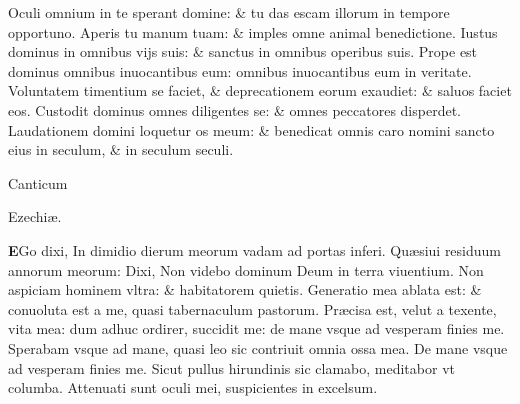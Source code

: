 \documentclass[a5paper,10pt]{book}
\def\leftmarginnote{%
	\lrmarginnote{\hskip -\marginparsep \hskip -6.5em}}
\def\ae{æ}
\begin{document}
\begin{multicols*}{2}
\newline \color{red} O\color{black}culi omnium in te sperant domine: \& tu das escam illorum in tempore opportuno.
\newline \color{red} A\color{black}peris tu manum tuam: \& imples omne animal benedictione.
\newline \color{red} I\color{black}ustus dominus in omnibus vijs suis: \& sanctus in omnibus operibus suis.
\newline \color{red} P\color{black}rope est dominus omnibus inuocantibus eum: omnibus inuocantibus eum in veritate.
\newline \color{red} V\color{black}oluntatem timentium se faciet, \& deprecationem eorum exaudiet: \& saluos faciet eos.
\newline \color{red} C\color{black}ustodit dominus omnes diligentes se: \& omnes peccatores disperdet.
\newline \color{red} L\color{black}audationem domini loquetur os meum: \& benedicat omnis caro nomini sancto eius in seculum, \& in seculum seculi.
\vspace{-1em}
\begin{center} \color{red}
\hypertarget{Ezekiel}{Canticum} Ezechi\ae .
\end{center}
\vspace{-1em}
\lettrine[lines=2]{\bfseries \color{red} E}{}Go dixi,\leftmarginnote{\begin{flushright}Isa.\\38.\end{flushright}} In dimidio dierum meorum vadam ad portas inferi.
\newline \color{red} Q\color{black}u\ae siui residuum annorum meorum: Dixi, Non videbo dominum Deum in terra viuentium.
\newline \color{red} N\color{black}on aspiciam hominem vltra: \& habitatorem quietis.
\newline \color{red} G\color{black}eneratio mea ablata est: \& conuoluta est a me, quasi tabernaculum pastorum.
\newline \color{red} P\color{black}r\ae cisa est, velut a texente, vita mea: dum adhuc ordirer, succidit me: de mane vsque ad vesperam finies me.
\newline \color{red} S\color{black}perabam vsque ad mane, quasi leo sic contriuit omnia ossa mea.
\newline \color{red} D\color{black}e mane vsque ad vesperam finies me. Sicut pullus hirundinis sic clamabo, meditabor vt columba.
\newline \color{red} A\color{black}ttenuati sunt oculi mei, suspicientes in excelsum.

\end{multicols*}
\end{document}
